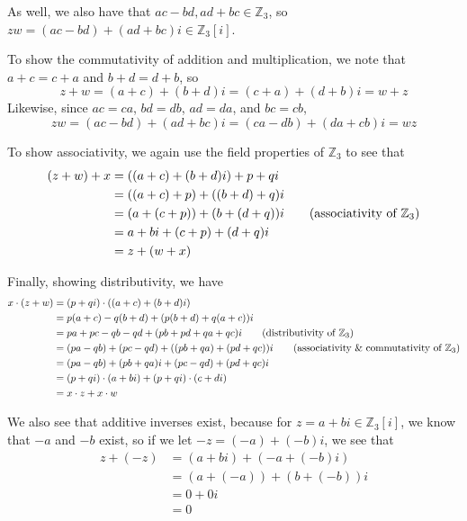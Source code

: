 \documentclass{article}
\theoremstyle{plain} %
\numberwithin{thm}{section} %
\theoremstyle{definition}
\begin{document}
\begin{question}{3}
        As well, we also have that \(ac - bd, ad + bc \in \mathbb{Z}_3\), so \(zw = (ac - bd) + (ad  +bc)i \in \mathbb{Z}_3[i]\).

        \smallbreak

        To show the commutativity of addition and multiplication, we note that \(a + c = c + a\) and \(b + d = d + b\), so
        \[
            z + w = (a + c) + (b + d)i = (c + a) + (d + b)i = w + z
        \]
        Likewise, since \(ac = ca\), \(bd = db\), \(ad = da\), and \(bc = cb\),
        \[
            zw = (ac - bd) + (ad + bc)i = (ca - db) + (da + cb)i = wz
        \]

        \smallbreak

        To show associativity, we again use the field properties of \(\mathbb{Z}_3\) to see that
        \begin{align*}
            (z + w) + x &= ((a + c) + (b + d)i) + p + qi \\
            &= ((a + c) + p) + ((b + d) + q)i \\
            &= (a + (c + p)) + (b + (d + q))i \tag{associativity of \(\mathbb{Z}_3\)} \\
            &= a + bi + (c + p) + (d + q)i \\
            &= z + (w + x)
        \end{align*}

        \smallbreak

        Finally, showing distributivity, we have
        \begin{align*}
            x \cdot (z + w) &= (p + qi) \cdot ((a + c) + (b + d)i) \\
            &= p(a + c) - q(b + d) + (p(b + d) + q(a + c))i \\
            &= pa + pc - qb - qd + (pb + pd + qa + qc)i \tag{distributivity of \(\mathbb{Z}_3\)} \\
            &= (pa - qb) + (pc - qd) + ((pb + qa) + (pd + qc))i \tag{associativity \& commutativity of \(\mathbb{Z}_3\)} \\
            &= (pa - qb) + (pb + qa)i + (pc - qd) + (pd + qc)i \\
            &= (p + qi) \cdot (a + bi) + (p + qi) \cdot (c + di) \\
            &= x \cdot z + x \cdot w
        \end{align*}

        We also see that additive inverses exist, because for \(z = a + bi \in \mathbb{Z} _3[i]\), we know that \(-a\) and \(-b\) exist, so if we let \(-z = (-a) + (-b)i\), we see that
        \begin{align*}
            z + (-z) &= (a + bi) + (-a + (-b)i) \\
            &= (a + (-a)) + (b + (-b))i \\
            &= 0 + 0i \\
            &= 0
        \end{align*}


\end{question}
\end{document}
